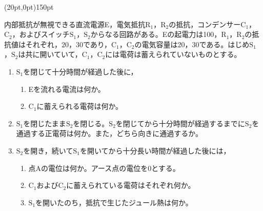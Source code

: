 \hakosyokika
\item
    \begin{mawarikomi}(20pt,0pt){150pt}{
        
    }
    内部抵抗が無視できる直流電源E，電気抵抗$\mathrm{R_1}$，$\mathrm{R_2}$の抵抗，コンデンサー$\mathrm{C_1}$，$\mathrm{C_2}$，およびスイッチ$\mathrm{S_1}$，$\mathrm{S_2}$からなる回路がある。Eの起電力は100，$\mathrm{R_1}$，$\mathrm{R_2}$の抵抗値はそれぞれ，$20$\sftanni{\Omega }，$30$\sftanni{\Omega }であり，$\mathrm{C_1}$，$\mathrm{C_2}$の電気容量は$20$，$30$である。はじめ$\mathrm{S_1}$，$\mathrm{S_2}$は共に開いていて，$\mathrm{C_1}$，$\mathrm{C_2}$には電荷は蓄えられていないものとする。
        \begin{enumerate}
            \item $\mathrm{S_1}$を閉じて十分時間が経過した後に，
                \begin{enumerate}[ア.]
                    \item Eを流れる電流は何か。
                    \item $\mathrm{C_1}$に蓄えられる電荷は何か。
                \end{enumerate}
            \item $\mathrm{S_1}$を閉じたまま$\mathrm{S_2}$を閉じる。$\mathrm{S_2}$を閉じてから十分時間が経過するまでに$\mathrm{S_2}$を通過する正電荷は何か。また，どちら向きに通過するか。
            \item $\mathrm{S_2}$を開き，続いて$\mathrm{S_1}$を開いてから十分長い時間が経過した後には，
                \begin{enumerate}[ア.]
                    \item 点Aの電位は何か。アース点の電位を$0$とする。
                    \item $\mathrm{C_1}$および$\mathrm{C_2}$に蓄えられている電荷はそれぞれ何か。
                    \item $\mathrm{S_1}$を開いたのち，抵抗で生じたジュール熱は何か。
                \end{enumerate}
        \end{enumerate}
    \end{mawarikomi}